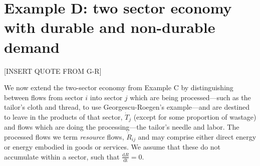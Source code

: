 %
%
%
\chapter{Example D: two sector economy with durable and non-durable demand}
\label{chap:two_sector_durable} %





[INSERT QUOTE FROM G-R]

We now extend the two-sector economy from Example C by distinguishing between flows from sector $i$ into sector $j$ which are being processed---such as the tailor's cloth and thread, to use Georgescu-Roegen's example---and are destined to leave in the products of that sector, $\dot{T}_{j}$ (except for some proportion of wastage) and flows which are doing the processing---the tailor's needle and labor. The processed flows we term \emph{resource} flows, $\dot{R}_{ij}$ and may comprise either direct energy or energy embodied in goods or services. We assume that these do not accumulate within a sector, such that $\frac{\textrm{d}R}{\textrm{dt}} = 0$.

